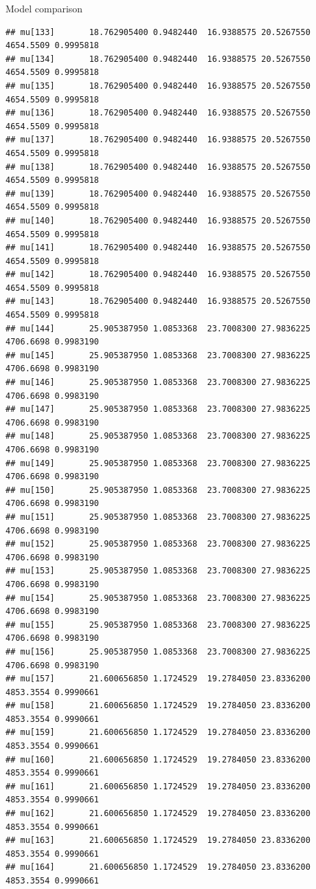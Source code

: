 \documentclass[
  ignorenonframetext,
]{beamer}
\begin{document}
\begin{frame}[fragile]{Model comparison}
\begin{verbatim}
## mu[133]       18.762905400 0.9482440  16.9388575 20.5267550 4654.5509 0.9995818
## mu[134]       18.762905400 0.9482440  16.9388575 20.5267550 4654.5509 0.9995818
## mu[135]       18.762905400 0.9482440  16.9388575 20.5267550 4654.5509 0.9995818
## mu[136]       18.762905400 0.9482440  16.9388575 20.5267550 4654.5509 0.9995818
## mu[137]       18.762905400 0.9482440  16.9388575 20.5267550 4654.5509 0.9995818
## mu[138]       18.762905400 0.9482440  16.9388575 20.5267550 4654.5509 0.9995818
## mu[139]       18.762905400 0.9482440  16.9388575 20.5267550 4654.5509 0.9995818
## mu[140]       18.762905400 0.9482440  16.9388575 20.5267550 4654.5509 0.9995818
## mu[141]       18.762905400 0.9482440  16.9388575 20.5267550 4654.5509 0.9995818
## mu[142]       18.762905400 0.9482440  16.9388575 20.5267550 4654.5509 0.9995818
## mu[143]       18.762905400 0.9482440  16.9388575 20.5267550 4654.5509 0.9995818
## mu[144]       25.905387950 1.0853368  23.7008300 27.9836225 4706.6698 0.9983190
## mu[145]       25.905387950 1.0853368  23.7008300 27.9836225 4706.6698 0.9983190
## mu[146]       25.905387950 1.0853368  23.7008300 27.9836225 4706.6698 0.9983190
## mu[147]       25.905387950 1.0853368  23.7008300 27.9836225 4706.6698 0.9983190
## mu[148]       25.905387950 1.0853368  23.7008300 27.9836225 4706.6698 0.9983190
## mu[149]       25.905387950 1.0853368  23.7008300 27.9836225 4706.6698 0.9983190
## mu[150]       25.905387950 1.0853368  23.7008300 27.9836225 4706.6698 0.9983190
## mu[151]       25.905387950 1.0853368  23.7008300 27.9836225 4706.6698 0.9983190
## mu[152]       25.905387950 1.0853368  23.7008300 27.9836225 4706.6698 0.9983190
## mu[153]       25.905387950 1.0853368  23.7008300 27.9836225 4706.6698 0.9983190
## mu[154]       25.905387950 1.0853368  23.7008300 27.9836225 4706.6698 0.9983190
## mu[155]       25.905387950 1.0853368  23.7008300 27.9836225 4706.6698 0.9983190
## mu[156]       25.905387950 1.0853368  23.7008300 27.9836225 4706.6698 0.9983190
## mu[157]       21.600656850 1.1724529  19.2784050 23.8336200 4853.3554 0.9990661
## mu[158]       21.600656850 1.1724529  19.2784050 23.8336200 4853.3554 0.9990661
## mu[159]       21.600656850 1.1724529  19.2784050 23.8336200 4853.3554 0.9990661
## mu[160]       21.600656850 1.1724529  19.2784050 23.8336200 4853.3554 0.9990661
## mu[161]       21.600656850 1.1724529  19.2784050 23.8336200 4853.3554 0.9990661
## mu[162]       21.600656850 1.1724529  19.2784050 23.8336200 4853.3554 0.9990661
## mu[163]       21.600656850 1.1724529  19.2784050 23.8336200 4853.3554 0.9990661
## mu[164]       21.600656850 1.1724529  19.2784050 23.8336200 4853.3554 0.9990661

\end{verbatim}
\end{frame}
\end{document}
